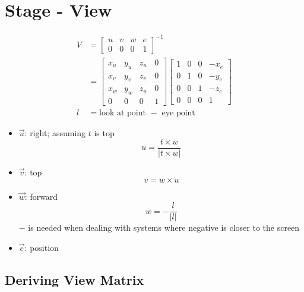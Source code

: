 \section{Stage - View}

  \begin{align}
    V &=
    \begin{bmatrix}
      u & v & w & e \\
      0 & 0 & 0 & 1
    \end{bmatrix}^{-1} \\
    &=
    \begin{bmatrix}
      x_{u} & y_{u} & z_{u} & 0 \\
      x_{v} & y_{v} & z_{v} & 0 \\
      x_{w} & y_{w} & z_{w} & 0 \\
      0 & 0 & 0 & 1
    \end{bmatrix}
    \begin{bmatrix}
      1 & 0 & 0 & -x_{e} \\
      0 & 1 & 0 & -y_{e} \\
      0 & 0 & 1 & -z_{e} \\
      0 & 0 & 0 & 1
    \end{bmatrix} \\
    l &= \text{look at point } - \text{ eye point}
  \end{align}

  \begin{itemize}
    \item $ \vec{u} $: right; assuming $ t $ is top
    \begin{equation}
      u = \frac{t \times w}{\left| t \times w \right|}
    \end{equation}

    \item $ \vec{v} $: top
    \begin{equation}
      v = w \times u
    \end{equation}

    \item $ \vec{w} $: forward
    \begin{equation}
      w = - \frac{l}{\left| l \right|}
    \end{equation}
    $ - $ is needed when dealing with systems where negative is closer to the
    screen

    \item $ \vec{e} $: position
  \end{itemize}

  \subsection{Deriving View Matrix}

